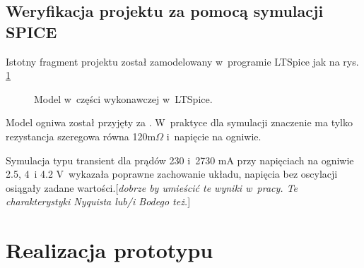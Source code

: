 \documentclass[polish,engineer]{polsl-msth}
\newcommand{\remark}[1]{{[\color{GREEN}\emph{\footnotesize #1}{}]}}
\begin{document}
\section{Weryfikacja projektu za pomocą symulacji SPICE}
Istotny fragment projektu został zamodelowany w~programie LTSpice jak na rys. \ref{img:modelLTv1}
\begin{figure}[hbtp]
\centering
     \caption{Model w~części wykonawczej w~LTSpice. \label{img:modelLTv1}}
\end{figure}
Model ogniwa został przyjęty za \cite{8759769_cellmodel1storder}. W~praktyce dla symulacji znaczenie ma tylko rezystancja szeregowa równa 120m$\Omega$ i~napięcie na ogniwie.

Symulacja typu transient dla prądów 230 i~2730 mA przy napięciach na ogniwie 2.5, 4~i 4.2 V~wykazała poprawne zachowanie układu, napięcia bez oscylacji osiągały zadane wartości.\remark{dobrze by umieścić te wyniki w~pracy. Te charakterystyki Nyquista lub/i Bodego też.}

\chapter{Realizacja prototypu}
\end{document}

